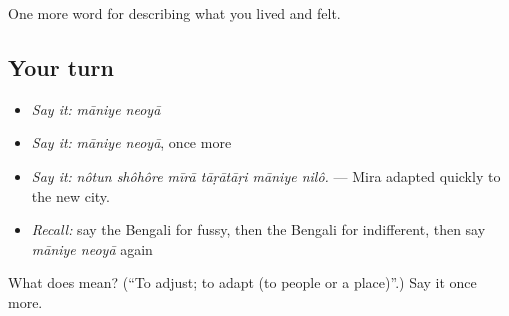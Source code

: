 \begin{grammarlens}[title={What you've built}]
One more word for describing what you lived and felt.
\end{grammarlens}

\subsection*{Your turn}
\begin{itemize}
\raggedright
  \item \emph{Say it:} \emph{māniye neoyā}
  \item \emph{Say it:} \emph{māniye neoyā}, once more
  \item \emph{Say it:} \emph{nôtun shôhôre mīrā tāṛātāṛi māniye nilô.} — Mira adapted quickly to the new city.
  \item \emph{Recall:} say the Bengali for fussy, then the Bengali for indifferent, then say \emph{māniye neoyā} again
\end{itemize}

\begin{tcolorbox}[breakable,colback=teal!4,colframe=teal!35!black,title={Before you move on}]
What does   mean? (\textquotedblleft{}To adjust; to adapt (to people or a place)\textquotedblright{}.) Say it once more.
\end{tcolorbox}
